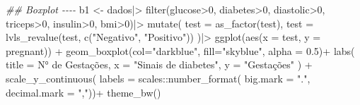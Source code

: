 \documentclass[
  letterpaper,
  DIV=11,
  numbers=noendperiod]{scrartcl}
\newenvironment{Shaded}{\begin{snugshade}}{\end{snugshade}}
\newcommand{\AttributeTok}[1]{\textcolor[rgb]{0.40,0.45,0.13}{#1}}
\newcommand{\DecValTok}[1]{\textcolor[rgb]{0.68,0.00,0.00}{#1}}
\newcommand{\DocumentationTok}[1]{\textcolor[rgb]{0.37,0.37,0.37}{\textit{#1}}}
\newcommand{\FloatTok}[1]{\textcolor[rgb]{0.68,0.00,0.00}{#1}}
\newcommand{\FunctionTok}[1]{\textcolor[rgb]{0.28,0.35,0.67}{#1}}
\newcommand{\NormalTok}[1]{\textcolor[rgb]{0.00,0.23,0.31}{#1}}
\newcommand{\OtherTok}[1]{\textcolor[rgb]{0.00,0.23,0.31}{#1}}
\newcommand{\SpecialCharTok}[1]{\textcolor[rgb]{0.37,0.37,0.37}{#1}}
\newcommand{\StringTok}[1]{\textcolor[rgb]{0.13,0.47,0.30}{#1}}
\begin{document}
\begin{Shaded}
\begin{Highlighting}[]
\DocumentationTok{\#\# Boxplot {-}{-}{-}{-}}
\NormalTok{b1 }\OtherTok{\textless{}{-}}\NormalTok{ dados}\SpecialCharTok{|\textgreater{}}
  \FunctionTok{filter}\NormalTok{(glucose}\SpecialCharTok{\textgreater{}}\DecValTok{0}\NormalTok{, diabetes}\SpecialCharTok{\textgreater{}}\DecValTok{0}\NormalTok{, diastolic}\SpecialCharTok{\textgreater{}}\DecValTok{0}\NormalTok{,}
\NormalTok{         triceps}\SpecialCharTok{\textgreater{}}\DecValTok{0}\NormalTok{, insulin}\SpecialCharTok{\textgreater{}}\DecValTok{0}\NormalTok{, bmi}\SpecialCharTok{\textgreater{}}\DecValTok{0}\NormalTok{)}\SpecialCharTok{|\textgreater{}}
  \FunctionTok{mutate}\NormalTok{(}
    \AttributeTok{test =} \FunctionTok{as\_factor}\NormalTok{(test),}
    \AttributeTok{test =} \FunctionTok{lvls\_revalue}\NormalTok{(test, }\FunctionTok{c}\NormalTok{(}\StringTok{"Negativo"}\NormalTok{, }\StringTok{"Positivo"}\NormalTok{))}
\NormalTok{  )}\SpecialCharTok{|\textgreater{}}
  \FunctionTok{ggplot}\NormalTok{(}\FunctionTok{aes}\NormalTok{(}\AttributeTok{x =}\NormalTok{ test, }\AttributeTok{y =}\NormalTok{ pregnant)) }\SpecialCharTok{+}
  \FunctionTok{geom\_boxplot}\NormalTok{(}\AttributeTok{col=}\StringTok{"darkblue"}\NormalTok{, }\AttributeTok{fill=}\StringTok{"skyblue"}\NormalTok{, }\AttributeTok{alpha =} \FloatTok{0.5}\NormalTok{)}\SpecialCharTok{+}
  \FunctionTok{labs}\NormalTok{(}
    \AttributeTok{title =} \StringTok{\textquotesingle{}N° de Gestações\textquotesingle{}}\NormalTok{,}
    \AttributeTok{x =} \StringTok{"Sinais de diabetes"}\NormalTok{,}
    \AttributeTok{y =} \StringTok{"Gestações"}
\NormalTok{  ) }\SpecialCharTok{+}
  \FunctionTok{scale\_y\_continuous}\NormalTok{(}
    \AttributeTok{labels =}\NormalTok{ scales}\SpecialCharTok{::}\FunctionTok{number\_format}\NormalTok{(}
      \AttributeTok{big.mark =} \StringTok{"."}\NormalTok{,}
      \AttributeTok{decimal.mark =} \StringTok{","}\NormalTok{))}\SpecialCharTok{+}
  \FunctionTok{theme\_bw}\NormalTok{()}
  

\end{Highlighting}
\end{Shaded}
\end{document}
